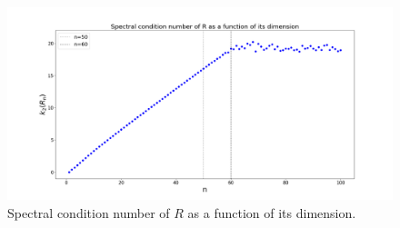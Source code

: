 \documentclass[a4paper,11pt]{article}
\begin{document}
\begin{figure}[H]
	\centering
	\includegraphics[scale=0.25]{Plot/Spectral_cond_num_R}
	\caption{Spectral condition number of $R$ as a function of its dimension.}
	\label{fig:Spectral_cond_num_R}
\end{figure}
\end{document}
